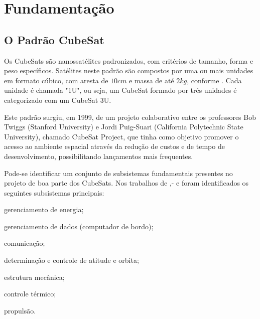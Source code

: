 \chapter{Fundamentação}\label{cap:fundamentacao}

\section{O Padrão CubeSat}\label{sec:cubesats}

Os CubeSats são nanossatélites padronizados, com critérios de tamanho, forma e peso específicos.
Satélites neste padrão são compostos por uma ou mais unidades em formato cúbico, com aresta de \(10cm\) e massa de até \(2kg\), conforme \textcite{cds}.
Cada unidade é chamada "1U", ou seja, um CubeSat formado por três unidades é categorizado com um CubeSat 3U.

Este padrão surgiu, em 1999, de um projeto colaborativo entre os professores Bob Twiggs (Stanford University) e Jordi Puig-Suari (California Polytechnic State University), chamado CubeSat Project, que tinha como objetivo promover o acesso ao ambiente espacial através da redução de custos e de tempo de desenvolvimento, possibilitando lançamentos mais frequentes.

Pode-se identificar um conjunto de subsistemas fundamentais presentes no projeto de boa parte dos 
CubeSats. Nos trabalhos de \textcite{tailoring-ecss-nanosat},- \textcite{survey-nanosat-missions-2010} e \textcite{reliability-of-cubesats} foram identificados os seguintes subsistemas principais:

\begin{alineas}
    \item gerenciamento de energia;
    \item gerenciamento de dados (computador de bordo);
    \item comunicação;
    \item determinação e controle de atitude e orbita;
    \item estrutura mecânica;
    \item controle térmico;
    \item propulsão.
\end{alineas}
\vspace{3mm}

